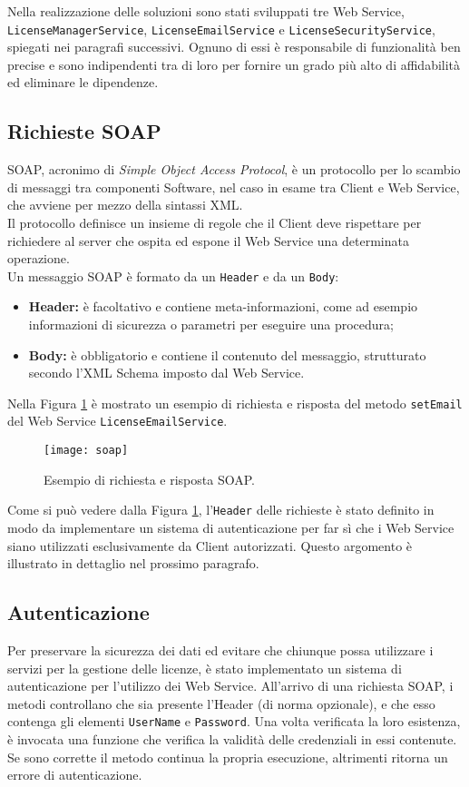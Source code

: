 Nella realizzazione delle soluzioni sono stati sviluppati tre Web Service,\\ \texttt{LicenseManagerService}, \texttt{LicenseEmailService} e \texttt{LicenseSecurityService}, spiegati nei paragrafi successivi. Ognuno di essi è responsabile di funzionalità ben precise e sono indipendenti tra di loro per fornire un grado più alto di affidabilità ed eliminare le dipendenze.


\subsection{Richieste SOAP}
\label{soap}
SOAP, acronimo di \textit{Simple Object Access Protocol}, è un protocollo per lo scambio di messaggi tra componenti Software, nel caso in esame tra Client e Web Service, che avviene per mezzo della sintassi XML. \\
Il protocollo definisce un insieme di regole che il Client deve rispettare per richiedere al server che ospita ed espone il Web Service una determinata operazione.
\\
Un messaggio SOAP è formato da un \texttt{Header} e da un \texttt{Body}:
\begin{itemize}
\item \textbf{Header:} è facoltativo e contiene meta-informazioni, come ad esempio informazioni di sicurezza o parametri per eseguire una procedura;
\item \textbf{Body:} è obbligatorio e contiene il contenuto del messaggio, strutturato secondo l'\gls{XML Schema} imposto dal Web Service.
\end{itemize}

Nella Figura \ref{soap} è mostrato un esempio di richiesta e risposta del metodo \texttt{setEmail} del Web Service \texttt{LicenseEmailService}.

\begin{figure}[!h] 
    \centering 
    \texttt{[image: soap]} 
    \caption{Esempio di richiesta e risposta SOAP.}
    \label{soap}
\end{figure}

Come si può vedere dalla Figura \ref{soap}, l'\texttt{Header} delle richieste è stato definito in modo da implementare un sistema di autenticazione per far sì che i Web Service siano utilizzati esclusivamente da Client autorizzati. Questo argomento è illustrato in dettaglio nel prossimo paragrafo.

\subsection{Autenticazione}
Per preservare la sicurezza dei dati ed evitare che chiunque possa utilizzare i servizi per la gestione delle licenze, è stato implementato un sistema di autenticazione per l'utilizzo dei Web Service. All'arrivo di una richiesta SOAP, i metodi controllano che sia presente l'Header (di norma opzionale), e che esso contenga gli elementi \texttt{UserName} e \texttt{Password}. Una volta verificata la loro esistenza, è invocata una funzione che verifica la validità delle credenziali in essi contenute. Se sono corrette il metodo continua la propria esecuzione, altrimenti ritorna un errore di autenticazione.

